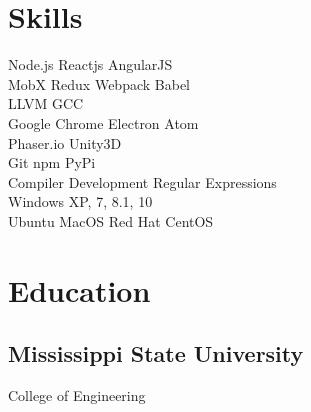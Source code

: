 \documentclass[]{resume}
\begin{document}
%
%
\header

%
%
\begin{minipage}[t]{0.33\textwidth}

\section{Skills}
Node.js \textbullet{} Reactjs \textbullet{} AngularJS \\
MobX \textbullet{} Redux \textbullet{} Webpack \textbullet{} Babel \\
LLVM \textbullet{} GCC \\

Google Chrome \textbullet{} Electron \textbullet{} Atom \\
Phaser.io \textbullet{} Unity3D \\

Git \textbullet{} npm \textbullet{} PyPi \\
Compiler Development \textbullet{} Regular Expressions \\

Windows XP, 7, 8.1, 10 \\
Ubuntu \textbullet{} MacOS \textbullet{} Red Hat \textbullet{} CentOS \\

\sectionsep

\section{Education}

\subsection{Mississippi State University}
College of Engineering \\


\end{minipage}
\end{document}
